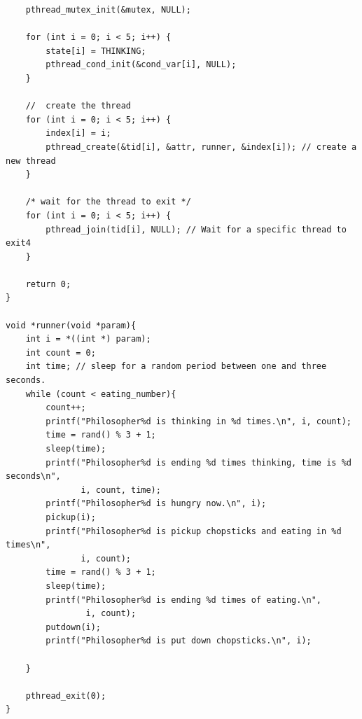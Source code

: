 \documentclass[12pt]{article}
\newenvironment{sol}[1][Solution]{\begin{trivlist}\item[\hskip\labelsep {\bfseries #1:}]}{\end{trivlist}}
\begin{document}
\begin{sol}
\begin{verbatim}
    pthread_mutex_init(&mutex, NULL);

    for (int i = 0; i < 5; i++) {
        state[i] = THINKING;
        pthread_cond_init(&cond_var[i], NULL);
    }

    //  create the thread
    for (int i = 0; i < 5; i++) {
        index[i] = i;
        pthread_create(&tid[i], &attr, runner, &index[i]); // create a new thread
    }

    /* wait for the thread to exit */
    for (int i = 0; i < 5; i++) {
        pthread_join(tid[i], NULL); // Wait for a specific thread to exit4
    }

    return 0;
}

void *runner(void *param){
    int i = *((int *) param);
    int count = 0;
    int time; // sleep for a random period between one and three seconds.
    while (count < eating_number){
        count++;
        printf("Philosopher%d is thinking in %d times.\n", i, count);
        time = rand() % 3 + 1;
        sleep(time);
        printf("Philosopher%d is ending %d times thinking, time is %d seconds\n",
               i, count, time);
        printf("Philosopher%d is hungry now.\n", i);
        pickup(i);
        printf("Philosopher%d is pickup chopsticks and eating in %d times\n", 
               i, count);
        time = rand() % 3 + 1;
        sleep(time);
        printf("Philosopher%d is ending %d times of eating.\n", 
                i, count);
        putdown(i);
        printf("Philosopher%d is put down chopsticks.\n", i);

    }

    pthread_exit(0);
}
        

\end{verbatim}
\end{sol}
\end{document}
